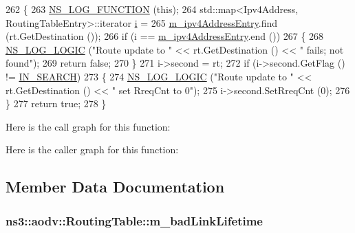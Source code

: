 \begin{DoxyCode}
262 \{
263   \hyperlink{log-macros-disabled_8h_a90b90d5bad1f39cb1b64923ea94c0761}{NS\_LOG\_FUNCTION} (\textcolor{keyword}{this});
264   std::map<Ipv4Address, RoutingTableEntry>::iterator \hyperlink{bernuolliDistribution_8m_a6f6ccfcf58b31cb6412107d9d5281426}{i} =
265     \hyperlink{classns3_1_1aodv_1_1RoutingTable_adb33ba98f0792226c0f1ea7f260f3139}{m\_ipv4AddressEntry}.find (rt.GetDestination ());
266   \textcolor{keywordflow}{if} (i == \hyperlink{classns3_1_1aodv_1_1RoutingTable_adb33ba98f0792226c0f1ea7f260f3139}{m\_ipv4AddressEntry}.end ())
267     \{
268       \hyperlink{group__logging_ga88acd260151caf2db9c0fc84997f45ce}{NS\_LOG\_LOGIC} (\textcolor{stringliteral}{"Route update to "} << rt.GetDestination () << \textcolor{stringliteral}{" fails; not found"});
269       \textcolor{keywordflow}{return} \textcolor{keyword}{false};
270     \}
271   i->second = rt;
272   \textcolor{keywordflow}{if} (i->second.GetFlag () != \hyperlink{group__aodv_gga44216921a9c725a5ab8bc19059052a26aba44cda5a5df371b6567f70d7d8311fa}{IN\_SEARCH})
273     \{
274       \hyperlink{group__logging_ga88acd260151caf2db9c0fc84997f45ce}{NS\_LOG\_LOGIC} (\textcolor{stringliteral}{"Route update to "} << rt.GetDestination () << \textcolor{stringliteral}{" set RreqCnt to 0"});
275       i->second.SetRreqCnt (0);
276     \}
277   \textcolor{keywordflow}{return} \textcolor{keyword}{true};
278 \}
\end{DoxyCode}


Here is the call graph for this function\+:




Here is the caller graph for this function\+:




\subsection{Member Data Documentation}
\subsubsection[{\texorpdfstring{m\+\_\+bad\+Link\+Lifetime}{m_badLinkLifetime}}]{ ns3\+::aodv\+::\+Routing\+Table\+::m\+\_\+bad\+Link\+Lifetime\hspace{0.3cm}{\ttfamily [private]}}\hypertarget{classns3_1_1aodv_1_1RoutingTable_a51bd9310a9318a82e49d943fba7b8577}{}\label{classns3_1_1aodv_1_1RoutingTable_a51bd9310a9318a82e49d943fba7b8577}


